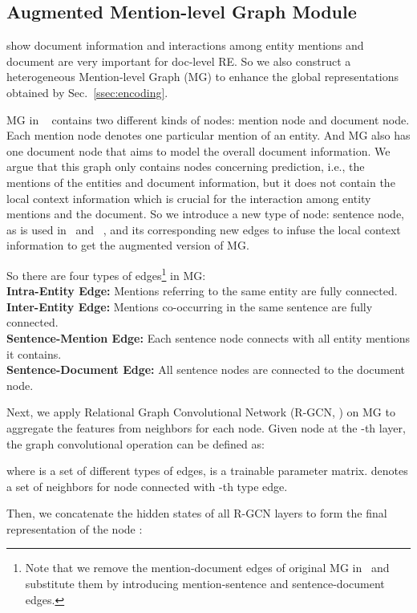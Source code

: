 \documentclass[11pt,a4paper]{article}
\begin{document}
\subsection{Augmented Mention-level Graph Module\label{ssec:MG}}
\citet{GAIN} show document information and interactions among entity mentions and document are very important for doc-level RE. So we also construct a heterogeneous Mention-level Graph (MG) to enhance the global representations obtained by Sec.~\ref{ssec:encoding}.

MG in ~\citet{GAIN} contains two different kinds of nodes: mention node and document node. Each mention node denotes one particular mention of an entity. And MG also has one document node that aims to model the overall document information. We argue that this graph only contains nodes concerning prediction, i.e., the mentions of the entities and document information, but it does not contain the local context information which is crucial for the interaction among entity mentions and the document. So we introduce a new type of node: sentence node, as is used in~\citet{EoG} and ~\citet{GLRE}, and its corresponding new edges to infuse the local context information to get the augmented version of MG.

So there are four types of edges\footnote{Note that we remove the mention-document edges of original MG in~\citep{GAIN} and substitute them by introducing mention-sentence and sentence-document edges.} in MG: \\
\noindent
\textbf{Intra-Entity Edge:} Mentions referring to the same entity are fully connected. \\
\noindent
\textbf{Inter-Entity Edge:} Mentions co-occurring in the same sentence are fully connected. \\
\noindent
\textbf{Sentence-Mention Edge:} Each sentence node connects with all entity mentions it contains. \\
\noindent
\noindent
\textbf{Sentence-Document Edge:} All sentence nodes are connected to the document node.

Next, we apply Relational Graph Convolutional Network (R-GCN, \citealp{RGCN}) on MG to aggregate the features from neighbors for each node. Given node  at the -th layer, the graph convolutional operation can be defined as:

where  is a set of different types of edges,  is a trainable parameter matrix.
 denotes a set of neighbors for node  connected with -th type edge.

Then, we concatenate the hidden states of all R-GCN layers to form the final representation of the node :
\end{document}
